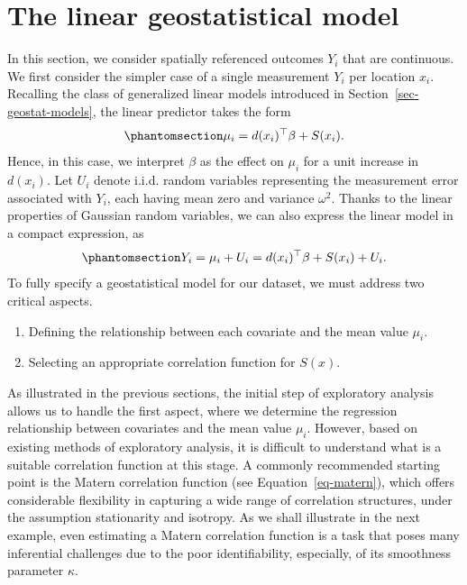 \documentclass[
  letterpaper,
]{krantz}
\providecommand{\tightlist}{%
  \setlength{\itemsep}{0pt}\setlength{\parskip}{0pt}}
\begin{document}
\section{The linear geostatistical model}\label{sec-linear-model}

In this section, we consider spatially referenced outcomes \(Y_i\) that
are continuous. We first consider the simpler case of a single
measurement \(Y_i\) per location \(x_i\). Recalling the class of
generalized linear models introduced in
Section~\ref{sec-geostat-models}, the linear predictor takes the form
\begin{equation}\phantomsection\label{eq-linear-geostat-model-lp}{
\mu_{i} = d(x_i)^\top \beta + S(x_i).
}\end{equation} Hence, in this case, we interpret \(\beta\) as the
effect on \(\mu_i\) for a unit increase in \(d(x_i)\). Let \(U_i\)
denote i.i.d. random variables representing the measurement error
associated with \(Y_i\), each having mean zero and variance
\(\omega^2\). Thanks to the linear properties of Gaussian random
variables, we can also express the linear model in a compact expression,
as \begin{equation}\phantomsection\label{eq-linear-geostat-model}{
Y_i = \mu_i + U_i = d(x_i)^\top \beta + S(x_i) + U_i.
}\end{equation} To fully specify a geostatistical model for our dataset,
we must address two critical aspects.

\begin{enumerate}
\def\labelenumi{\arabic{enumi}.}
\tightlist
\item
  Defining the relationship between each covariate and the mean value
  \(\mu_i\).
\item
  Selecting an appropriate correlation function for \(S(x)\).
\end{enumerate}

As illustrated in the previous sections, the initial step of exploratory
analysis allows us to handle the first aspect, where we determine the
regression relationship between covariates and the mean value \(\mu_i\).
However, based on existing methods of exploratory analysis, it is
difficult to understand what is a suitable correlation function at this
stage. A commonly recommended starting point is the Matern correlation
function (see Equation~\ref{eq-matern}), which offers considerable
flexibility in capturing a wide range of correlation structures, under
the assumption stationarity and isotropy. As we shall illustrate in the
next example, even estimating a Matern correlation function is a task
that poses many inferential challenges due to the poor identifiability,
especially, of its smoothness parameter \(\kappa\).
\end{document}
